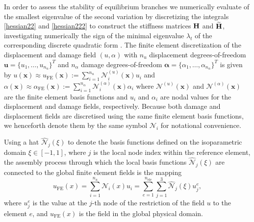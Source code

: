 \documentclass[10pt]{article}
\begin{document}
In order to assess the stability of equilibrium branches we numerically evaluate of the smallest eigenvalue of the second variation by discretizing the integrals \eqref{hessian22} and   \eqref{hessian222} to construct the stiffness matrices
$\mathbf{H}$ and $\widetilde{\mathbf{H}}$, investigating numerically the sign of the minimal eigenvalue $\lambda_t$ of the corresponding discrete quadratic form \cite{Sanderson2016-ht}.  The finite element discretization of the displacement and damage field $(u, \alpha )$     with \( n_u \) displacement degrees-of-freedom
$
    \mathbf{u} = \{ u_1, \ldots, u_{n_u} \}^T
$
and \( n_\alpha \) damage degrees-of-freedom
$
    \boldsymbol{\alpha} = \{ \alpha_1, \ldots, \alpha_{n_\alpha} \}^T
$ is given by
$
    u(\mathbf{x}) \approx u_{\text{FE}} (\mathbf{x}) := \sum_{i=1}^{n_u} \mathcal{N}^{(u)}_i(\mathbf{x}) u_i $
and $\alpha(\mathbf{x}) \approx \alpha_{\text{FE}} (\mathbf{x}) := \sum_{i=1}^{n_\alpha} \mathcal{N}^{(\alpha)}_i (\mathbf{x}) \alpha_i
$
where $\mathcal{N}^{(u)}(\mathbf{x}) $ and $\mathcal{N}^{(\alpha)}(\mathbf{x}) $ are the finite element basis functions and {$u_i$} and {$\alpha_i$} are nodal values for the displacement and damage fields, respectively. {Because both damage and displacement fields are discretised using the same finite element basis functions, we henceforth denote them by the same symbol $\mathcal N_i$ for notational convenience.}

{
Using a hat $\hat{\mathcal{N}}_j(\xi)$ to denote the basis functions defined on the isoparametric domain $\xi \in [-1, 1]$, where $j$ is the local node index within the reference element, the assembly process through which the local basis functions $\hat{\mathcal{N}}_j(\xi)$ are connected to the global finite element fields is the mapping
$$u_{\text{FE}}(x) = \sum_{i=1}^{n_u} \mathcal N_i(x) u_i = \sum_{e=1}^{n_\text{ele}} \sum_{j=1}^{3} \hat{\mathcal {N}}_j(\xi) u_j^e,$$
where $u_j^e$ is the value at the $j$-th node of the restriction of the field $u$ to the element $e$, and $u_{\text{FE}}(x)$ is the field in the global physical domain.}
\end{document}
